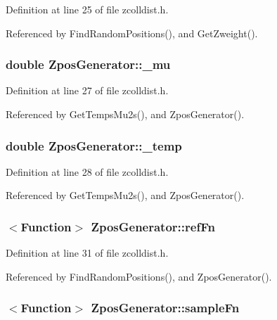 Definition at line 25 of file zcolldist.h.

Referenced by FindRandomPositions(), and GetZweight().
\subsubsection{\setlength{\rightskip}{0pt plus 5cm}double {\bf ZposGenerator::\_\-mu}\hspace{0.3cm}{\tt  [private]}}\label{classZposGenerator_fd43d806cc5d8ab6dd2a422ec40ea585}




Definition at line 27 of file zcolldist.h.

Referenced by GetTempsMu2s(), and ZposGenerator().
\subsubsection{\setlength{\rightskip}{0pt plus 5cm}double {\bf ZposGenerator::\_\-temp}\hspace{0.3cm}{\tt  [private]}}\label{classZposGenerator_61581d2b91282a426764210e1ba8fad1}




Definition at line 28 of file zcolldist.h.

Referenced by GetTempsMu2s(), and ZposGenerator().
\subsubsection{$<${\bf Function}$>$ {\bf ZposGenerator::refFn}\hspace{0.3cm}{\tt  [private]}}\label{classZposGenerator_f450ae3118a1d07d4983c0e50ad8ea96}




Definition at line 31 of file zcolldist.h.

Referenced by FindRandomPositions(), and ZposGenerator().
\subsubsection{$<${\bf Function}$>$ {\bf ZposGenerator::sampleFn}\hspace{0.3cm}{\tt  [private]}}\label{classZposGenerator_850f0eb2564b3149d51898e28a9cbc22}




